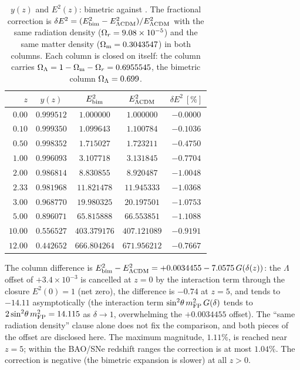 \begin{table}[h]
\centering\small
\caption{$y(z)$ and $E^2(z)$: bimetric against \LCDM{}. The fractional correction is $\delta E^2=(E^2_{\rm bim}-E^2_{\Lambda{\rm CDM}})/E^2_{\Lambda{\rm CDM}}$ with the same radiation density ($\Omega_{r}=9.08\times10^{-5}$) and the same matter density ($\Omega_{\mathrm m}=0.3043547$) in both columns. Each column is closed on itself: the \LCDM{} column carries $\Omega_{\Lambda}=1-\Omega_{\mathrm m}-\Omega_{r}=0.6955545$, the bimetric column $\Omega_{\Lambda}=0.699$.}\label{tab:A2}
\begin{tabular}{@{}rcccc@{}}
\toprule
$z$ & $y(z)$ & $E^2_{\rm bim}$ & $E^2_{\Lambda{\rm CDM}}$ & $\delta E^2\ [\%]$\\
\midrule
$0.00$ & $0.999512$ & $1.000000$ & $1.000000$ & $-0.0000$\\
$0.10$ & $0.999350$ & $1.099643$ & $1.100784$ & $-0.1036$\\
$0.50$ & $0.998352$ & $1.715027$ & $1.723211$ & $-0.4750$\\
$1.00$ & $0.996093$ & $3.107718$ & $3.131845$ & $-0.7704$\\
$2.00$ & $0.986814$ & $8.830855$ & $8.920487$ & $-1.0048$\\
$2.33$ & $0.981968$ & $11.821478$ & $11.945333$ & $-1.0368$\\
$3.00$ & $0.968770$ & $19.980325$ & $20.197501$ & $-1.0753$\\
$5.00$ & $0.896071$ & $65.815888$ & $66.553851$ & $-1.1088$\\
$10.00$ & $0.556527$ & $403.379176$ & $407.121089$ & $-0.9191$\\
$12.00$ & $0.442652$ & $666.804264$ & $671.956212$ & $-0.7667$\\
\bottomrule
\end{tabular}
\end{table}
The column difference is $E^2_{\rm bim}-E^2_{\Lambda{\rm CDM}}=+0.0034455-7.0575\,G(\delta(z))$: the $\Lambda$ offset of $+3.4\times10^{-3}$ is cancelled at $z=0$ by the interaction term through the closure $E^2(0)=1$ (net zero), the difference is $-0.74$ at $z=5$, and tends to $-14.11$ asymptotically (the interaction term $\sin^2\!\theta\,m_{\mathrm{FP}}^2\,G(\delta)$ tends to $2\sin^2\!\theta\,m_{\mathrm{FP}}^2=14.115$ as $\delta\to1$, overwhelming the $+0.0034455$ offset). The ``same radiation density'' clause alone does not fix the comparison, and both pieces of the offset are disclosed here. The maximum magnitude, $1.11\%$, is reached near $z=5$; within the BAO/SNe redshift ranges the correction is at most $1.04\%$. The correction is negative (the bimetric expansion is slower) at all $z>0$.

